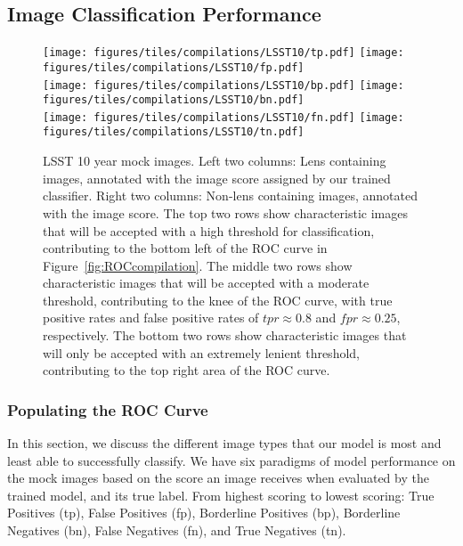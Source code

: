 \documentclass{emulateapj}
\begin{document}
\subsection{Image Classification Performance}\label{sec:performance}

\begin{figure*}[t]
\begin{center}
\texttt{[image: figures/tiles/compilations/LSST10/tp.pdf]}\hspace{5pt}
\texttt{[image: figures/tiles/compilations/LSST10/fp.pdf]}\\\vspace{5pt}
\texttt{[image: figures/tiles/compilations/LSST10/bp.pdf]}\hspace{5pt}
\texttt{[image: figures/tiles/compilations/LSST10/bn.pdf]}\\\vspace{5pt}
\texttt{[image: figures/tiles/compilations/LSST10/fn.pdf]}\hspace{5pt}
\texttt{[image: figures/tiles/compilations/LSST10/tn.pdf]}\\
\caption{LSST 10 year mock images. Left two columns: Lens containing
  images, annotated with the image score assigned by our trained
  classifier.  Right two columns: Non-lens containing images,
  annotated with the image score.  The top two rows show
  characteristic images that will be accepted with a high threshold
  for classification, contributing to the bottom left of the ROC curve
  in Figure~\ref{fig:ROCcompilation}.  The middle two rows show
  characteristic images that will be accepted with a moderate
  threshold, contributing to the knee of the ROC curve, with true
  positive rates and false positive rates of $tpr\approx0.8$ and
  $fpr\approx0.25$, respectively.  The bottom two rows show
  characteristic images that will only be accepted with an extremely
  lenient threshold, contributing to the top right area of the ROC
  curve.}\label{fig:ROCsamplesLSST10}
\end{center}
\end{figure*}

\subsubsection{Populating the ROC Curve}
In this section, we discuss the different image types that our model
is most and least able to successfully classify.  We have six
paradigms of model performance on the mock images based on the score
an image receives when evaluated by the trained model, and its true
label.  From highest scoring to lowest scoring: True Positives (tp),
False Positives (fp), Borderline Positives (bp), Borderline Negatives
(bn), False Negatives (fn), and True Negatives (tn).
\end{document}
